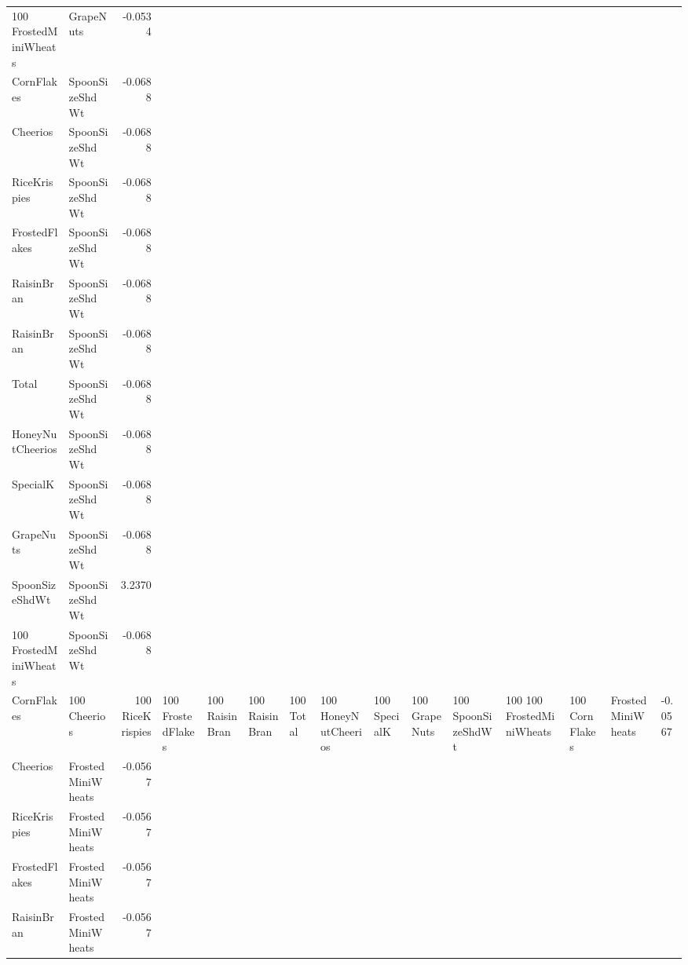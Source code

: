 \begin{longtable}{llr}
100%
FrostedMiniWheats & GrapeNuts & -0.0534 \\
CornFlakes & SpoonSizeShdWt & -0.0688 \\
Cheerios & SpoonSizeShdWt & -0.0688 \\
RiceKrispies & SpoonSizeShdWt & -0.0688 \\
FrostedFlakes & SpoonSizeShdWt & -0.0688 \\
RaisinBran & SpoonSizeShdWt & -0.0688 \\
RaisinBran & SpoonSizeShdWt & -0.0688 \\
Total & SpoonSizeShdWt & -0.0688 \\
HoneyNutCheerios & SpoonSizeShdWt & -0.0688 \\
SpecialK & SpoonSizeShdWt & -0.0688 \\
GrapeNuts & SpoonSizeShdWt & -0.0688 \\
SpoonSizeShdWt & SpoonSizeShdWt & 3.2370 \\
100%
FrostedMiniWheats & SpoonSizeShdWt & -0.0688 \\
CornFlakes & 100%
Cheerios & 100%
RiceKrispies & 100%
FrostedFlakes & 100%
RaisinBran & 100%
RaisinBran & 100%
Total & 100%
HoneyNutCheerios & 100%
SpecialK & 100%
GrapeNuts & 100%
SpoonSizeShdWt & 100%
100%
FrostedMiniWheats & 100%
CornFlakes & FrostedMiniWheats & -0.0567 \\
Cheerios & FrostedMiniWheats & -0.0567 \\
RiceKrispies & FrostedMiniWheats & -0.0567 \\
FrostedFlakes & FrostedMiniWheats & -0.0567 \\
RaisinBran & FrostedMiniWheats & -0.0567 \\

\end{longtable}
